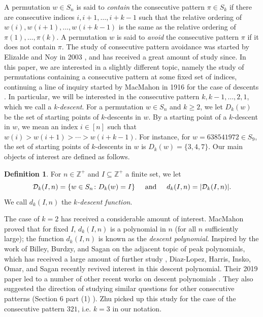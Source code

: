 \documentclass{amsart}
\theoremstyle{definition}
\newtheorem{definition}[theorem]{Definition}
\begin{document}
A permutation $w\in S_n$ is said to \emph{contain} the consecutive pattern $\pi\in S_k$ if there are consecutive indices $i,i+1,\ldots, i+k-1$ such that the relative ordering of $w(i),w(i+1),\ldots, w(i+k-1)$ is the same as the relative ordering of $\pi(1), \ldots, \pi(k)$. A permutation $w$ is said to \emph{avoid} the consecutive pattern $\pi$ if it does not contain $\pi$. The study of consecutive pattern avoidance was started by Elizalde and Noy in 2003 \cite{ELIZALDE2003110}, and has received a great amount of study since. In this paper, we are interested in a slightly different topic, namely the study of permutations containing a consecutive pattern at some fixed set of indices, continuing a line of inquiry started by MacMahon in 1916 for the case of descents \cite{macmahon}. In particular, we will be interested in the consecutive pattern  $k,k-1, \ldots ,2,1$, which we call a \emph{k-descent}. For a permutation $w\in S_n$ and $k\geq 2$, we let $D_k(w)$ be the set of starting points of $k$-descents in $w$. By a starting point of a $k$-descent in $w$, we mean an index $i\in [n]$ such that $w(i)>w(i+1)>\cdots>w(i+k-1)$. For instance, for $w=638541972\in S_9$, the set of starting points of $k$-descents in $w$ is $D_k(w)=\{3,4,7\}$. Our main objects of interest are defined as follows.
\begin{definition}
For $n\in \mathbb{Z}^+$ and $I\subseteq \mathbb{Z}^+$ a finite set, we let
\[\mathcal{D}_k(I,n)=\{w\in S_n\colon D_k(w)=I\}\hspace{5mm}\text{and}\hspace{5mm} d_k(I,n)=|\mathcal{D}_k(I,n)|.\]
We call $d_k(I,n)$ the \emph{$k$-descent function}. 
\end{definition}

The case of $k=2$ has received a considerable amount of interest. MacMahon \cite{macmahon} proved that for fixed $I$, $d_k(I,n)$ is a polynomial in $n$ (for all $n$ sufficiently large); the function $d_k(I,n)$ is known as the \emph{descent polynomial}. Inspired by the work of Billey, Burdzy, and Sagan \cite{billey} on the adjacent topic of peak polynomials, which has received a large amount of further study \cite{MR3463566}\cite{DAVIS20183249}\cite{DIAZLOPEZ201721}, Diaz-Lopez, Harris, Insko, Omar, and Sagan \cite{diaz} recently revived interest in this descent polynomial. Their 2019 paper led to a number of other recent works on descent polynomials \cite{gaetz2019qanalogs}\cite{jiradilok2019roots}\cite{Oguz2019DescentPP}. They also suggested the direction of studying similar questions for other consecutive patterns (Section 6 part (1) \cite{diaz}). Zhu picked up this study \cite{zhu2019enumerating} for the case of the consecutive pattern $321$, i.e. $k=3$ in our notation.
\end{document}
